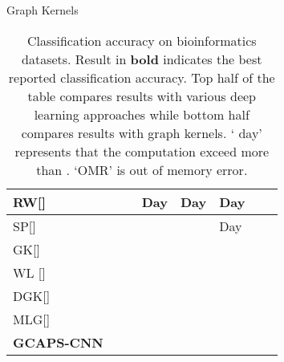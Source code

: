 \documentclass{article}
\begin{document}
\begin{table*}[t!]
	
	
	\begin{center}
		Graph Kernels
	\end{center}
	
	\begin{tabular}{ @{} >{\raggedright}p{2cm} |    K{1.6cm}  !{\vrule width0.8pt} K{1.6cm}  !{\vrule width0.8pt} K{1.6cm} !{\vrule width0.8pt} K{1.6cm}   !{\vrule width0.8pt} K{2cm}   !{\vrule width0.8pt}K{1.6cm}   !{\vrule width0.8pt} K{1.6cm} | }	 
		\hline
		RW[\citeyear{gartner2003graph}]       &&     & Day&   Day & Day&     \\  \hline
		SP[\citeyear{borgwardt2005shortest}]       &&     &&   &Day  &     \\  \hline
		GK[\citeyear{shervashidze2009efficient}]       &&     &&   &&     \\  \hline
		WL [\citeyear{shervashidze2011weisfeiler}]    &&     &&   &&     \\  \hline
		DGK[\citeyear{yanardag2015deep}]   &&     &&   &  &     \\  \hline
		MLG[\citeyear{kondor2016multiscale}]        &&     &&   &&     \\  \hline
		\textbf{GCAPS-CNN}        &&     &&    &  &     \\  \hline
	\end{tabular}
	
	\caption{Classification  accuracy   on bioinformatics datasets. Result in \textbf{bold} indicates the  best reported classification accuracy. Top half of the table compares results  with   various deep learning approaches while bottom half compares results with graph kernels. ` day' represents that the computation exceed more than . `OMR' is out of memory error.} \label{table:bio_results}
	
\end{table*}
\end{document}
